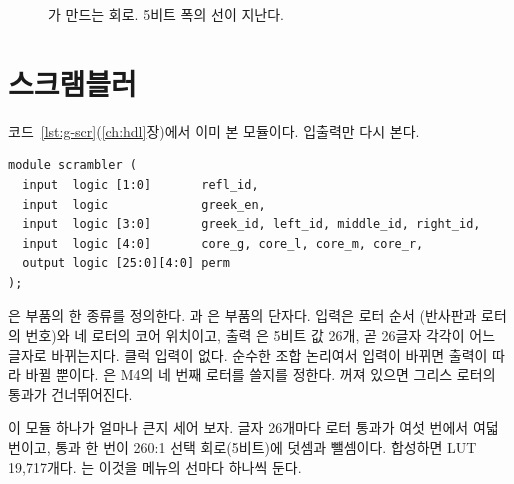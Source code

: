 \begin{figure}[ht]
\centering
{}
\caption{가 만드는 회로. 5비트 폭의 선이 지난다.}
\label{fig:g-rotorfwd}
\end{figure}

\section{스크램블러}

코드~\ref{lst:g-scr}(\ref{ch:hdl}장)에서 이미 본 모듈이다. 입출력만 다시 본다.

\begin{lstlisting}[language=SV,caption={\code{scrambler.sv}의 입출력.}]
module scrambler (
  input  logic [1:0]       refl_id,
  input  logic             greek_en,
  input  logic [3:0]       greek_id, left_id, middle_id, right_id,
  input  logic [4:0]       core_g, core_l, core_m, core_r,
  output logic [25:0][4:0] perm
);
\end{lstlisting}

은 부품의 한 종류를 정의한다. 과 은 부품의 단자다. 입력은 로터 순서
(반사판과 로터의 번호)와 네 로터의 코어 위치이고, 출력 은 5비트 값 26개, 곧 26글자 각각이 어느
글자로 바뀌는지다. 클럭 입력이 없다. 순수한 조합 논리여서 입력이 바뀌면 출력이 따라 바뀔 뿐이다.
은 M4의 네 번째 로터를 쓸지를 정한다. 꺼져 있으면 그리스 로터의 통과가 건너뛰어진다.

이 모듈 하나가 얼마나 큰지 세어 보자. 글자 26개마다 로터 통과가 여섯 번에서 여덟 번이고, 통과 한 번이
260:1 선택 회로(5비트)에 덧셈과 뺄셈이다. 합성하면 LUT 19,717개다. 는 이것을 메뉴의
선마다 하나씩 둔다.

